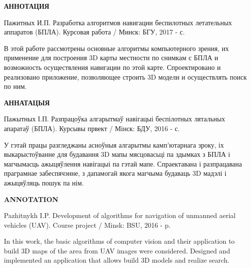 \begin{center}
     \large\bfseries{АННОТАЦИЯ}
\end{center}

Пажитных И.П. Разработка алгоритмов навигации беспилотных летательных аппаратов (БПЛА). Курсовая работа / Минск: БГУ, 2017 - \pageref{LastPage} с.

В этой работе рассмотрены основные алгоритмы компьютерного зрения, их применение для построения 3D карты местности по снимкам с БПЛА и возможность осуществления навигации по этой карте. Спроектировано и реализовано приложение, позволяющее строить 3D модели и осуществлять поиск по ним.

\begin{center}
     \large\bfseries{АННАТАЦЫЯ}
\end{center}

Пажытных І.П. Разпрацоўка алгарытмаў навігацыі беспілотных лятальных апаратаў (БПЛА). Курсывы првект / Мінск: БДУ, 2016 - \pageref{LastPage} с.

У гэтай працы разгледжаны асноўныя алгарытмы камп'ютарнага зроку, іх выкарыстоўванне для будавання 3D мапы мясцовасьці па здымках з БПЛА і магчымасць ажыцяўлення навігацыі па гэтай мапе. Спраектавана і разпрацавана праграмнае забеспячэнне, з дапамогай якога магчыма будаваць 3D мадэлі і ажыцяўляць пошук па нім.

\begin{center}
     \large\bfseries{ANNOTATION}
\end{center}

Pazhitnykh I.P. Development of algorithms for navigation of unmanned aerial vehicles (UAV). Course project / Minsk: BSU, 2016 - \pageref{LastPage} p.

In this work, the basic algorithms of computer vision and their application to build 3D maps of the area from UAV images were considered. Designed and implemented an application that allows build 3D models and realize search.

\newpage